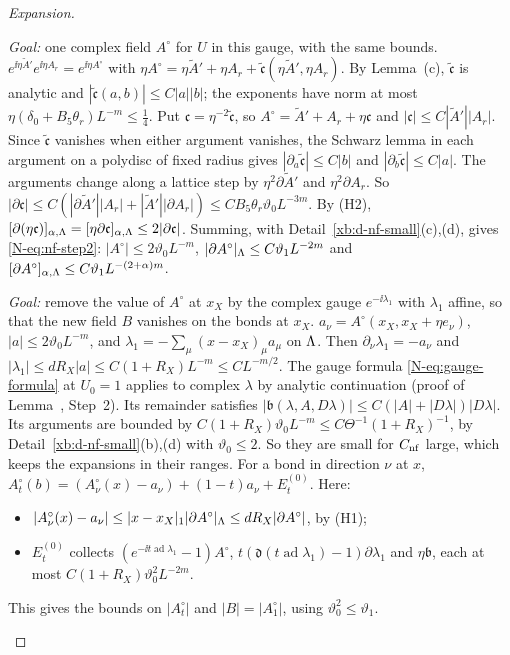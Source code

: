 \begin{proof}[Expansion]
\begin{step}
\emph{Goal:} one complex field $A^\circ$ for $U$ in this gauge, with the same bounds.
$e^{\ii\eta\tilde A'}e^{\ii\eta A_r}=e^{\ii\eta A^\circ}$ with $\eta A^\circ=\eta\tilde A'+\eta A_r+\tilde{\mathfrak c}(\eta\tilde A',\eta A_r)$. By Lemma~(c), $\tilde{\mathfrak c}$ is analytic and $|\tilde{\mathfrak c}(a,b)|\le C|a||b|$; the exponents have norm at most $\eta(\delta_0+B_5\theta_r)L^{-m}\le\frac14$. Put $\mathfrak c=\eta^{-2}\tilde{\mathfrak c}$, so $A^\circ=\tilde A'+A_r+\eta\mathfrak c$ and $|\mathfrak c|\le C|\tilde A'||A_r|$. Since $\tilde{\mathfrak c}$ vanishes when either argument vanishes, the Schwarz lemma in each argument on a polydisc of fixed radius gives $|\partial_a\tilde{\mathfrak c}|\le C|b|$ and $|\partial_b\tilde{\mathfrak c}|\le C|a|$. The arguments change along a lattice step by $\eta^2\partial\tilde A'$ and $\eta^2\partial A_r$. So $|\partial\mathfrak c|\le C(|\partial\tilde A'||A_r|+|\tilde A'||\partial A_r|)\le CB_5\theta_r\vartheta_0L^{-3m}$. By (H2), $[\partial(\eta\mathfrak c)]_{\alpha,\Lambda}=[\eta\partial\mathfrak c]_{\alpha,\Lambda}\le2|\partial\mathfrak c|$. Summing, with Detail~\ref{xb:d-nf-small}(c),(d), gives \eqref{N-eq:nf-step2}: $|A^\circ|\le2\vartheta_0L^{-m}$, $|\partial A^\circ|_\Lambda\le C\vartheta_1L^{-2m}$ and $[\partial A^\circ]_{\alpha,\Lambda}\le C\vartheta_1L^{-(2+\alpha)m}$.
\end{step}

\begin{step}
\emph{Goal:} remove the value of $A^\circ$ at $x_X$ by the complex gauge $e^{-\ii\lambda_1}$ with $\lambda_1$ affine, so that the new field $B$ vanishes on the bonds at $x_X$.
$a_\nu=A^\circ(x_X,x_X+\eta e_\nu)$, $|a|\le2\vartheta_0L^{-m}$, and $\lambda_1=-\sum_\mu(x-x_X)_\mu a_\mu$ on $\Lambda$. Then $\partial_\nu\lambda_1=-a_\nu$ and $|\lambda_1|\le dR_X|a|\le C(1+R_X)L^{-m}\le CL^{-m/2}$. The gauge formula \eqref{N-eq:gauge-formula} at $U_0=1$ applies to complex $\lambda$ by analytic continuation (proof of Lemma~, Step~2). Its remainder satisfies $|\mathfrak b(\lambda,A,D\lambda)|\le C(|A|+|D\lambda|)|D\lambda|$. Its arguments are bounded by $C(1+R_X)\vartheta_0L^{-m}\le C\Theta^{-1}(1+R_X)^{-1}$, by Detail~\ref{xb:d-nf-small}(b),(d) with $\vartheta_0\le2$. So they are small for $C_{\rm nf}$ large, which keeps the expansions in their ranges. For a bond in direction $\nu$ at $x$, $A^\circ_t(b)=(A^\circ_\nu(x)-a_\nu)+(1-t)a_\nu+E^{(0)}_t$. Here:
\begin{itemize}
\item $|A^\circ_\nu(x)-a_\nu|\le|x-x_X|_1|\partial A^\circ|_\Lambda\le dR_X|\partial A^\circ|$, by (H1);
\item $E^{(0)}_t$ collects $(e^{-\ii t\operatorname{ad}\lambda_1}-1)A^\circ$, $t(\mathfrak d(t\operatorname{ad}\lambda_1)-1)\partial\lambda_1$ and $\eta\mathfrak b$, each at most $C(1+R_X)\vartheta_0^2L^{-2m}$.
\end{itemize}
This gives the bounds on $|A^\circ_t|$ and $|B|=|A^\circ_1|$, using $\vartheta_0^2\le\vartheta_1$.


\end{step}
\end{proof}
